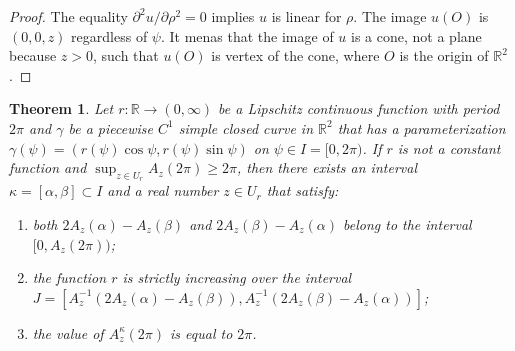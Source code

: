 \documentclass{amsart}
\theoremstyle{plain}
\newtheorem{theorem}{Theorem}[section]
\theoremstyle{definition}
\theoremstyle{remark}
\begin{document}
\begin{proof}%
The equality $\partial^2u/\partial\rho^2=0$ implies $u$ is linear for $\rho$.
The image $u(O)$ is $(0,0,z)$ regardless of $\psi$.
It menas that the image of $u$ is a cone, not a plane because $z>0$, such that $u(O)$ is vertex of the cone, where $O$ is the origin of $\mathbb{R}^2$.
\end{proof}







\begin{theorem}\label{4.3} %
Let $r:\mathbb{R}\to(0,\infty)$ be a Lipschitz continuous function with period $2\pi$ and $\gamma$ be a piecewise $C^1$ simple closed curve in $\mathbb{R}^2$ that has a parameterization $\gamma(\psi)=(r(\psi)\cos\psi,r(\psi)\sin\psi)$ on $\psi\in I=[0,2\pi)$. 
If $r$ is not a constant function and $\sup_{z\in U_r}A_z(2\pi)\ge2\pi$, then there exists an interval $\kappa=[\alpha,\beta]\subset I$ and a real number $z\in U_r$ that satisfy:
\begin{enumerate}
\item both $2A_z(\alpha)-A_z(\beta)$ and $2A_z(\beta)-A_z(\alpha)$ belong to the interval $[0,A_z(2\pi))$;
\item the function $r$ is strictly increasing over the interval $J=[A_z^{-1}(2A_z(\alpha)-A_z(\beta)),A_z^{-1}(2A_z(\beta)-A_z(\alpha))]$;
\item the value of $A_z^{\kappa}(2\pi)$ is equal to $2\pi$.
\end{enumerate}
\end{theorem}
\end{document}
